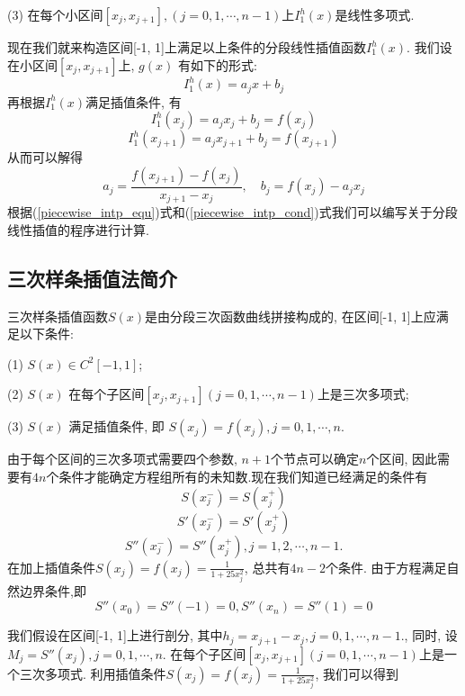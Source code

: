 \documentclass[a4paper]{article}
\begin{document}
\begin{spacing}{1.5}
\begin{CJK*}{GBK}{song}
(3) 在每个小区间$[x_j, x_{j+1}],(j=0,1,\cdots, n-1)$上$I_1^h(x)$是线性多项式.\par

现在我们就来构造区间[-1, 1]上满足以上条件的分段线性插值函数$I_1^h(x)$. 我们设在小区间$[x_j, x_{j+1}]$上, $g(x)$ 有如下的形式:
\begin{equation}\label{piecewise_intp_equ}
I_1^h(x)=a_jx+b_j
\end{equation}
再根据$I_1^h(x)$满足插值条件, 有
$$I_1^h(x_j)=a_jx_j+b_j=f(x_j)$$
$$I_1^h(x_{j+1})=a_jx_{j+1}+b_j=f(x_{j+1})$$
从而可以解得
\begin{equation}\label{piecewise_intp_cond}
a_j = \frac{f(x_{j+1})-f(x_j)}{x_{j+1}-x_{j}}, \quad
b_j = f(x_j)-a_jx_{j}
\end{equation}
根据(\ref{piecewise_intp_equ})式和(\ref{piecewise_intp_cond})式我们可以编写关于分段线性插值的程序进行计算.

\subsection{三次样条插值法简介}

三次样条插值函数$S(x)$是由分段三次函数曲线拼接构成的, 在区间[-1, 1]上应满足以下条件:

(1) $S(x)\in C^2[-1, 1]$; \par
(2) $S(x)$ 在每个子区间$[x_j, x_{j+1}] (j=0,1,\cdots, n-1)$上是三次多项式; \par
(3) $S(x)$ 满足插值条件, 即 $S(x_j)=f(x_j),j=0,1,\cdots, n.$

由于每个区间的三次多项式需要四个参数, $n+1$个节点可以确定$n$个区间, 因此需要有$4n$个条件才能确定方程组所有的未知数.现在我们知道已经满足的条件有
\begin{equation}
S(x_j^-)=S(x_j^+)
\end{equation}
\begin{equation}\label{S'}
S'(x_j^-)=S'(x_j^+)
\end{equation}
\begin{equation}
S''(x_j^-)=S''(x_j^+), j=1, 2, \cdots, n-1.
\end{equation}
在加上插值条件$S(x_j)=f(x_j)=\frac{1}{1+25x_j^2}$, 总共有$4n-2$个条件. 由于方程满足自然边界条件,即
\begin{equation}\label{nature}
S''(x_0)=S''(-1)=0, S''(x_n)=S''(1)=0
\end{equation}

我们假设在区间[-1, 1]上进行剖分, 其中$h_j=x_{j+1}-x_j, j=0,1,\cdots, n-1.$, 同时, 设$M_j=S''(x_j), j=0,1,\cdots, n.$ 在每个子区间$[x_j, x_{j+1}](j=0,1,\cdots, n-1)$上是一个三次多项式. 利用插值条件$S(x_j)=f(x_j)=\frac{1}{1+25x_j^2}$, 我们可以得到


\end{CJK*}
\end{spacing}
\end{document}
